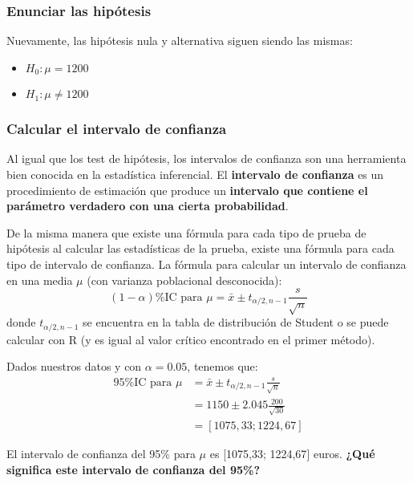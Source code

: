 \documentclass[
]{book}
\providecommand{\tightlist}{%
  \setlength{\itemsep}{0pt}\setlength{\parskip}{0pt}}
\begin{document}
\hypertarget{enunciar-las-hipuxf3tesis}{%
\subsubsection{Enunciar las hipótesis}\label{enunciar-las-hipuxf3tesis}}

Nuevamente, las hipótesis nula y alternativa siguen siendo las mismas:

\begin{itemize}
\tightlist
\item
  \(H_0:\mu = 1200\)
\item
  \(H_1:\mu\ne 1200\)
\end{itemize}

\hypertarget{calcular-el-intervalo-de-confianza}{%
\subsubsection{Calcular el intervalo de confianza}\label{calcular-el-intervalo-de-confianza}}

Al igual que los test de hipótesis, los intervalos de confianza son una herramienta bien conocida en la estadística inferencial. El \textbf{intervalo de confianza} es un procedimiento de estimación que produce un \textbf{intervalo que contiene el parámetro verdadero con una cierta probabilidad}.

De la misma manera que existe una fórmula para cada tipo de prueba de hipótesis al calcular las estadísticas de la prueba, existe una fórmula para cada tipo de intervalo de confianza. La fórmula para calcular un intervalo de confianza en una media \(\mu\) (con varianza poblacional desconocida):
\[
(1-\alpha)\text{\%IC para } \mu = \bar{x}\pm t_{\alpha/2, n - 1}\frac{s}{\sqrt{n}}
\]
donde \(t_{\alpha/2, n-1}\) se encuentra en la tabla de distribución de Student o se puede calcular con R (y es igual al valor crítico encontrado en el primer método).

Dados nuestros datos y con \(\alpha= 0.05\), tenemos que:
\[
\begin{aligned}
 95\text{\% IC para } \mu &= \bar{x} \pm t_{\alpha/2, n - 1} \frac{s}{\sqrt{n}} \\
 &= 1150 \pm 2.045 \frac{200}{\sqrt{30}} \\
 &= [1075,33; 1224,67]
\end{aligned}
\]

El intervalo de confianza del 95\% para \(\mu\) es {[}1075,33; 1224,67{]} euros. \textbf{¿Qué significa este intervalo de confianza del 95\%? }
\end{document}
